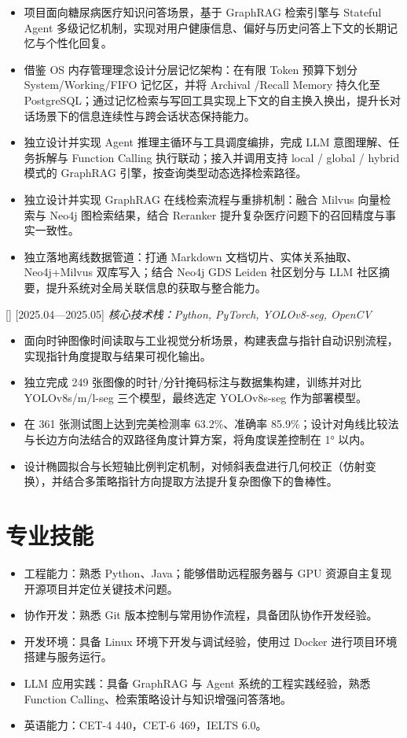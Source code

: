 \documentclass{resume-photo}
\begin{document}
\begin{itemize}
  \item 项目面向糖尿病医疗知识问答场景，基于 GraphRAG 检索引擎与 Stateful Agent 多级记忆机制，实现对用户健康信息、偏好与历史问答上下文的长期记忆与个性化回复。
  \item 借鉴 OS 内存管理理念设计分层记忆架构：在有限 Token 预算下划分 System/Working/FIFO 记忆区，并将 Archival /Recall Memory 持久化至 PostgreSQL；通过记忆检索与写回工具实现上下文的自主换入换出，提升长对话场景下的信息连续性与跨会话状态保持能力。
  \item 独立设计并实现 Agent 推理主循环与工具调度编排，完成 LLM 意图理解、任务拆解与 Function Calling 执行联动；接入并调用支持 local / global / hybrid 模式的 GraphRAG 引擎，按查询类型动态选择检索路径。
  \item 独立设计并实现 GraphRAG 在线检索流程与重排机制：融合 Milvus 向量检索与 Neo4j 图检索结果，结合 Reranker 提升复杂医疗问题下的召回精度与事实一致性。
  \item 独立落地离线数据管道：打通 Markdown 文档切片、实体关系抽取、Neo4j+Milvus 双库写入；结合 Neo4j GDS Leiden 社区划分与 LLM 社区摘要，提升系统对全局关联信息的获取与整合能力。
\end{itemize}

[]
[2025.04—2025.05]
\noindent\textit{核心技术栈：Python, PyTorch, YOLOv8-seg, OpenCV}\par

\begin{itemize}
  \item 面向时钟图像时间读取与工业视觉分析场景，构建表盘与指针自动识别流程，实现指针角度提取与结果可视化输出。
  \item 独立完成 249 张图像的时针/分针掩码标注与数据集构建，训练并对比 YOLOv8s/m/l-seg 三个模型，最终选定 YOLOv8s-seg 作为部署模型。
  \item 在 361 张测试图上达到完美检测率 63.2\%、准确率 85.9\%；设计对角线比较法与长边方向法结合的双路径角度计算方案，将角度误差控制在 1° 以内。
  \item 设计椭圆拟合与长短轴比例判定机制，对倾斜表盘进行几何校正（仿射变换），并结合多策略指针方向提取方法提升复杂图像下的鲁棒性。
\end{itemize}

\section{专业技能}
\begin{itemize}
  \item 工程能力：熟悉 Python、Java；能够借助远程服务器与 GPU 资源自主复现开源项目并定位关键技术问题。
  \item 协作开发：熟悉 Git 版本控制与常用协作流程，具备团队协作开发经验。
  \item 开发环境：具备 Linux 环境下开发与调试经验，使用过 Docker 进行项目环境搭建与服务运行。
  \item LLM 应用实践：具备 GraphRAG 与 Agent 系统的工程实践经验，熟悉 Function Calling、检索策略设计与知识增强问答落地。
  \item 英语能力：CET-4 440，CET-6 469，IELTS 6.0。
\end{itemize}
\end{document}
